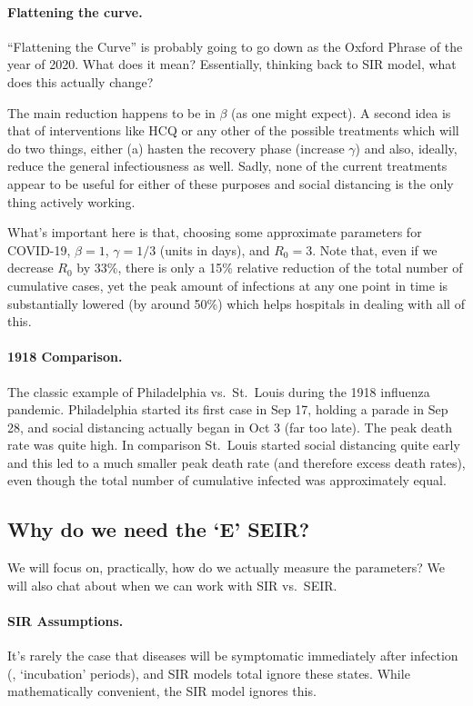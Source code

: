 \documentclass[12pt]{article}
\begin{document}
\paragraph{Flattening the curve.} ``Flattening the Curve'' is probably going to go down as the Oxford Phrase of the year of 2020. What does it mean? Essentially, thinking back to SIR model, what does this actually change?

The main reduction happens to be in $\beta$ (as one might expect). A second idea is that of interventions like HCQ or any other of the possible treatments which will do two things, either (a) hasten the recovery phase (increase $\gamma$) and also, ideally, reduce the general infectiousness as well. Sadly, none of the current treatments appear to be useful for either of these purposes and social distancing is the only thing actively working.

What's important here is that, choosing some approximate parameters for COVID-19, $\beta = 1$, $\gamma = 1/3$ (units in days), and $R_0 = 3$. Note that, even if we decrease $R_0$ by 33\%, there is only a 15\% relative reduction of the total number of cumulative cases, yet the peak amount of infections at any one point in time is substantially lowered (by around 50\%) which helps hospitals in dealing with all of this.

\paragraph{1918 Comparison.} The classic example of Philadelphia vs.\ St.\ Louis during the 1918 influenza pandemic. Philadelphia started its first case in Sep 17, holding a parade in Sep 28, and social distancing actually began in Oct 3 (far too late). The peak death rate was quite high. In comparison St.\ Louis started social distancing quite early and this led to a much smaller peak death rate (and therefore excess death rates), even though the total number of cumulative infected was approximately equal.

\subsection{Why do we need the `E' SEIR?}
We will focus on, practically, how do we actually measure the parameters? We will also chat about when we can work with SIR vs.\ SEIR.

\paragraph{SIR Assumptions.} It's rarely the case that diseases will be symptomatic immediately after infection (\ie, `incubation' periods), and SIR models total ignore these states. While mathematically convenient, the SIR model ignores this.
\end{document}
